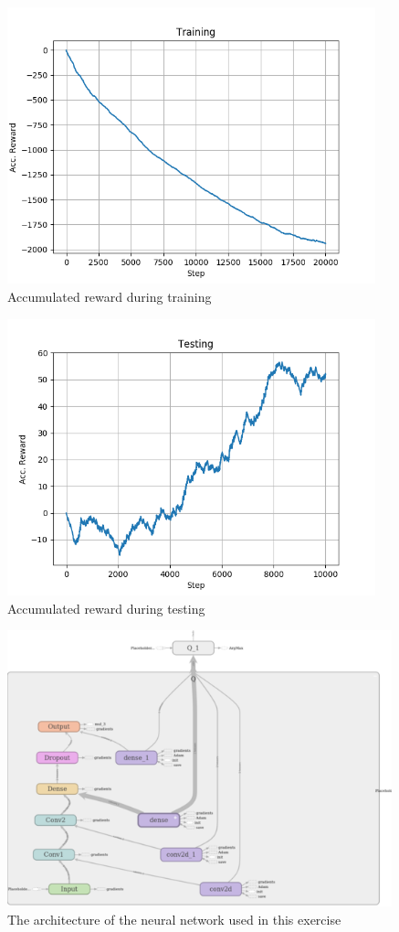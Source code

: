 \documentclass[a4paper, 11pt]{article}
\begin{document}
\begin{figure}[ht!]
    \centering
    \includegraphics[height=8cm]{images/acc_reward_train.png}
        \caption{Accumulated reward during training}
        \label{fig:acc_rew_train}
\end{figure}

\begin{figure}[ht!]
    \centering
    \includegraphics[height=8cm]{images/acc_reward_test.png}
        \caption{Accumulated reward during testing}
        \label{fig:acc_rew_test}
\end{figure}

\begin{figure}[ht!]
    \centering
    \includegraphics[height=8cm]{images/arch.png}
        \caption{The architecture of the neural network used in this exercise}
        \label{fig:nn_arch}
\end{figure}
\clearpage


\end{document}
